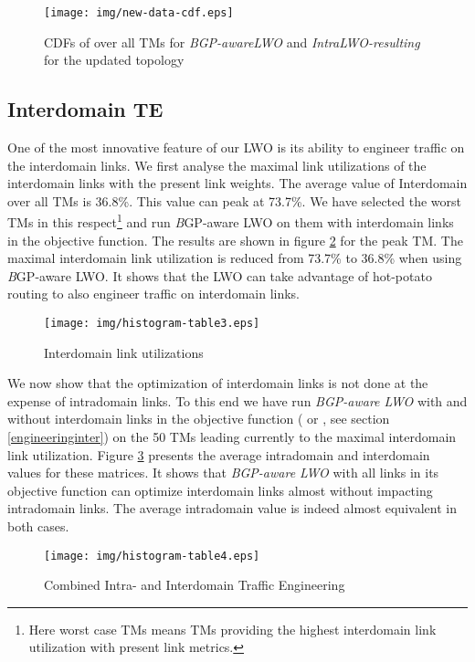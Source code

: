 \documentclass{acm_proc_article-sp}
\begin{document}
\begin{figure}[htbp]
  \centering
  \texttt{[image: img/new-data-cdf.eps]}
  \caption{CDFs of  over all TMs  for \textit{BGP-awareLWO} and \textit{IntraLWO-resulting} for the updated topology}
  \label{fig:cdfUmaxUpdatedTopo}
\end{figure}

\subsection{Interdomain TE}
\label{sec:interdomainte}

One of the most innovative feature of our LWO is its ability to engineer traffic on the
interdomain links. We first analyse the maximal link utilizations of the
interdomain links with the present link weights. The
average value of Interdomain  over all TMs is 36.8\%. 
This value can peak at 73.7\%. 
We have selected the worst TMs in this respect\footnote{ Here
    worst case TMs means TMs providing the highest interdomain link
    utilization with present link metrics.} and run {\textit BGP-aware LWO}
on them with interdomain links in the objective function. 
The results are shown in figure \ref{tab:interdomainte} for the peak TM. 
The maximal interdomain link utilization is reduced from 73.7\% to
36.8\% when using {\textit BGP-aware LWO}. It shows that the LWO can take advantage of hot-potato routing
to also engineer traffic on interdomain links.

\begin{figure}[htbp]
  \centering
  \texttt{[image: img/histogram-table3.eps]}
  \caption{Interdomain link utilizations}
  \label{tab:interdomainte}
\end{figure}

We now show that the optimization of interdomain links
is not done at the expense of intradomain links. 
To this end we have run {\it BGP-aware LWO} with and without
interdomain links in the objective function ( or , see section \ref{engineeringinter}) 
on the 50 TMs
leading currently to the maximal interdomain link
utilization. Figure \ref{tab:interdomainte2} presents the average
intradomain and interdomain  values for these matrices.
It shows that \textit{BGP-aware LWO} with all links in its
objective function can optimize interdomain links almost without 
impacting intradomain links. The average
intradomain  value is indeed almost equivalent in both cases.

\begin{figure}[htbp]
  \centering
  \texttt{[image: img/histogram-table4.eps]}
  \caption{Combined Intra- and Interdomain Traffic Engineering}
  \label{tab:interdomainte2}
\end{figure}
\end{document}
